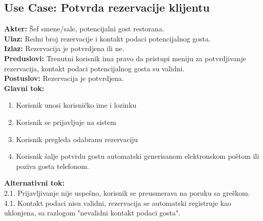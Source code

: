 \documentclass{article}
\begin{document}
\subsection{\textbf{Use Case}: Potvrda rezervacije klijentu}
\textbf{Akter:} Šef smene/sale, potencijalni gost restorana.\\
\textbf{Ulaz:} Redni broj rezervacije i kontakt podaci potencijalnog gosta.\\
\textbf{Izlaz:} Rezervacija je potvrdjena ili ne.\\
\textbf{Preduslovi:} Trenutni korisnik ima pravo da pristupi meniju za potvrdjivanje rezervacija, kontakt podaci potencijalnog gosta su validni.\\
\textbf{Postuslov:} Rezervacija je potvrdjena.\\
\textbf{Glavni tok:}
\begin{enumerate}
\item Korisnik unosi korisničko ime i lozinku
\item Korisnik se prijavljuje na sistem
\item Korisnik pregleda odabranu rezervaciju
\item Korisnik šalje potvrdu gostu automatski generisanom elektronskom poštom ili poziva gosta telefonom.\\
\end{enumerate}
\textbf{Alternativni tok:}\\
       2.1. Prijavljivanje nije uspešno, korisnik se preusmerava na poruku sa greškom.\\
       4.1. Kontakt podaci nisu validni, rezervacija se automatski registruje kao uklonjena, sa razlogom "nevalidni kontakt podaci gosta".\\
\end{document}

